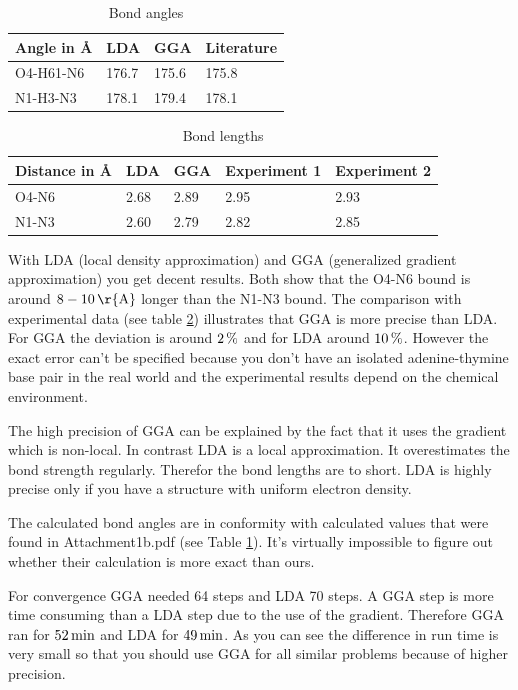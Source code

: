 \documentclass[12pt,a4paper]{scrartcl}
\begin{document}
\begin{table}[H]
\begin{tabular}{l||l|l|l}
Angle in \r{A} & LDA & GGA & Literature \footnotemark[1]\\ 
\hline \hline 
O4-H61-N6 & 176.7 & 175.6 & 175.8\\ 
\hline 
N1-H3-N3 & 178.1 & 179.4 & 178.1\\ 
\end{tabular}
\caption{Bond angles}\label{tab:angles}
\end{table}

\begin{table}[H]
\begin{tabular}{l||l|l|l|l}
Distance in \r{A} & LDA & GGA & Experiment 1 \footnotemark[1] & Experiment 2 \footnotemark[1] \\ 
\hline \hline 
O4-N6 & 2.68 & 2.89 & 2.95 & 2.93 \\ 
\hline 
N1-N3 & 2.60 & 2.79 & 2.82 & 2.85 \\ 
\end{tabular}
\caption{Bond lengths}\label{tab:lengths}
\end{table}


With LDA (local density approximation) and GGA (generalized gradient approximation) you get decent results. Both show that the O4-N6 bound is around $\unit[8 - 10]{\r{A}}$ longer than the N1-N3 bound. The comparison with experimental data (see table \ref{tab:lengths}) illustrates that GGA is more precise than LDA. For GGA the deviation is around $\unit[2]{\%}$ and for LDA around $\unit[10]{\%}$. However the exact error can't be specified because you don't have an isolated adenine-thymine base pair in the real world and the experimental results depend on the chemical environment.

The high precision of GGA can be explained by the fact that it uses the gradient which is non-local. In contrast LDA is a local approximation. It overestimates the bond strength regularly. Therefor the bond lengths are to short. LDA is highly precise only if you have a structure with uniform electron density.

The calculated bond angles are in conformity with calculated values that were found in Attachment1b.pdf (see Table \ref{tab:angles}). It's virtually impossible to figure out whether their calculation is more exact than ours.

For convergence GGA needed 64 steps and LDA 70 steps. A GGA step is more time consuming than a LDA step due to the use of the gradient. Therefore GGA ran for $\unit[52]{min}$ and LDA for $\unit[49]{min}$. As you can see the difference in run time is very small so that you should use GGA for all similar problems because of higher precision.
\end{document}
